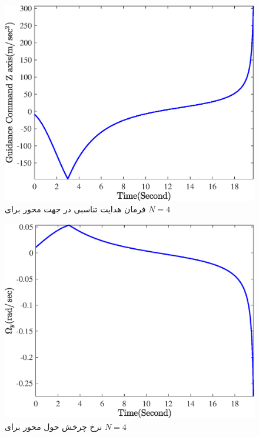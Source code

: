 \begin{figure}[H]
	\centering
	\includegraphics[width=.75\linewidth]{../Figure/Q1/b/GC_z_4}
	\caption{فرمان هدایت تناسبی در جهت محور
		برای 
		$N=4$}
\end{figure}

\begin{figure}[H]
	\centering
	\includegraphics[width=.75\linewidth]{../Figure/Q1/b/Omega_y_4}
	\caption{ نرخ چرخش حول محور
		برای 
		$N=4$}
\end{figure}

